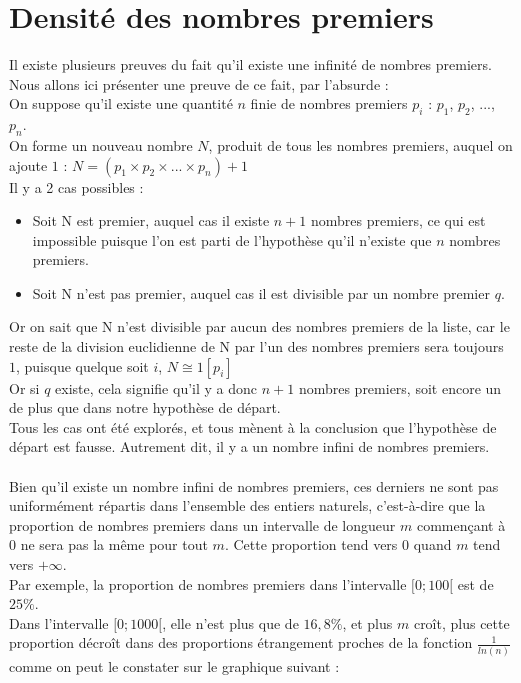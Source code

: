 	\section{Densité des nombres premiers}
		Il existe plusieurs preuves du fait qu'il existe une infinité de nombres premiers. Nous allons ici présenter une preuve de ce fait, par l'absurde :\\
		On suppose qu'il existe une quantité $n$ finie de nombres premiers $p_i$ : $p_1$, $p_2$, $...$, $p_n$.\\
		On forme un nouveau nombre $N$, produit de tous les nombres premiers, auquel on ajoute $1$ : $N = (p_1 \times p_2 \times ... \times p_n) + 1$\\
		Il y a 2 cas possibles :
		\begin{itemize}
			\item Soit N est premier, auquel cas il existe $n + 1$ nombres premiers, ce qui est impossible puisque l'on est parti de l'hypothèse qu'il n'existe que $n$ nombres premiers.
			\item Soit N n'est pas premier, auquel cas il est divisible par un nombre premier $q$.
		\end{itemize}
		Or on sait que N n'est divisible par aucun des nombres premiers de la liste, car le reste de la division euclidienne de N par l'un des nombres premiers sera toujours $1$, puisque quelque soit $i$, $N \cong 1 [p_i]$\\
		Or si $q$ existe, cela signifie qu'il y a donc $n + 1$ nombres premiers, soit encore un de plus que dans notre hypothèse de départ.\\
		Tous les cas ont été explorés, et tous mènent à la conclusion que l'hypothèse de départ est fausse. Autrement dit, il y a un nombre infini de nombres premiers.\\
		\\
		Bien qu'il existe un nombre infini de nombres premiers, ces derniers ne sont pas uniformément répartis dans l'ensemble des entiers naturels, c'est-à-dire que la proportion de nombres premiers dans un intervalle de longueur $m$ commençant à 0 ne sera pas la même pour tout $m$. Cette proportion tend vers $0$ quand $m$ tend vers $+\infty$.\\
		Par exemple, la proportion de nombres premiers dans l'intervalle $[0;100[$ est de $25\%$.\\
		Dans l'intervalle $[0;1000[$, elle n'est plus que de $16,8\%$, et plus $m$ croît, plus cette proportion décroît dans des proportions étrangement proches de la fonction $\frac{1}{ln(n)}$ comme on peut le constater sur le graphique suivant :\\
